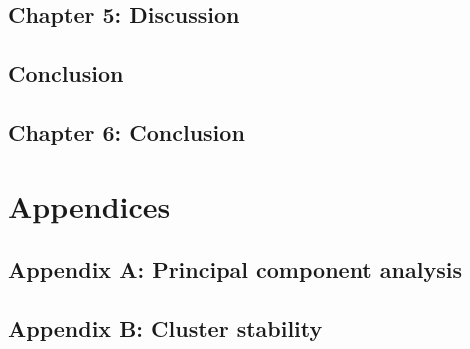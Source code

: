 \documentclass[12pt, TexShade, letterpaper]{report}
\makeatletter
\newcommand{\unchapter}[1]{%
  \begingroup
  \let\@makechapterhead\@gobble %
  \chapter{#1}
  \endgroup
}
\makeatother
\begin{document}
\chapter*{Chapter 5: Discussion}
\label{chap:discussion}


\unchapter{Conclusion}
\chapter*{Chapter 6: Conclusion}
\label{chap:conclusion}

\cleardoublepage
{}
{}
\begin{singlespace}
\printbibliography[keyword = mainbib, title={General references}]%
\end{singlespace}


%

\newpage

%
%








%
%

\appendix

\part{Appendices}
\chapter*{Appendix A: Principal component analysis}
\label{appendix:AppendixA}


\chapter*{Appendix B: Cluster stability}
\label{appendix:AppendixB}

\end{document}
